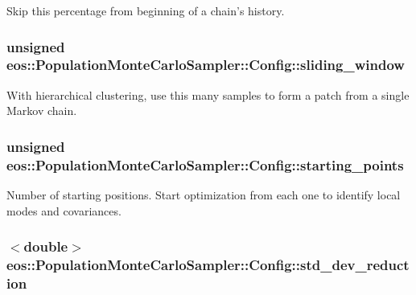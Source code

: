Skip this percentage from beginning of a chain's history. \hypertarget{structeos_1_1PopulationMonteCarloSampler_1_1Config_a9d8798a5789fd4fbe250dba673b92df6}{
\subsubsection[{sliding\_\-window}]{\setlength{\rightskip}{0pt plus 5cm}unsigned {\bf eos::PopulationMonteCarloSampler::Config::sliding\_\-window}}}
\label{structeos_1_1PopulationMonteCarloSampler_1_1Config_a9d8798a5789fd4fbe250dba673b92df6}
With hierarchical clustering, use this many samples to form a patch from a single Markov chain. \hypertarget{structeos_1_1PopulationMonteCarloSampler_1_1Config_a235c1a2d0c336f9f8ed9c58917acf68b}{
\subsubsection[{starting\_\-points}]{\setlength{\rightskip}{0pt plus 5cm}unsigned {\bf eos::PopulationMonteCarloSampler::Config::starting\_\-points}}}
\label{structeos_1_1PopulationMonteCarloSampler_1_1Config_a235c1a2d0c336f9f8ed9c58917acf68b}
Number of starting positions. Start optimization from each one to identify local modes and covariances. \hypertarget{structeos_1_1PopulationMonteCarloSampler_1_1Config_a9de01b257ce34b8a747de5dcf992e053}{
\subsubsection[{std\_\-dev\_\-reduction}]{$<$double$>$ {\bf eos::PopulationMonteCarloSampler::Config::std\_\-dev\_\-reduction}}}
\label{structeos_1_1PopulationMonteCarloSampler_1_1Config_a9de01b257ce34b8a747de5dcf992e053}
